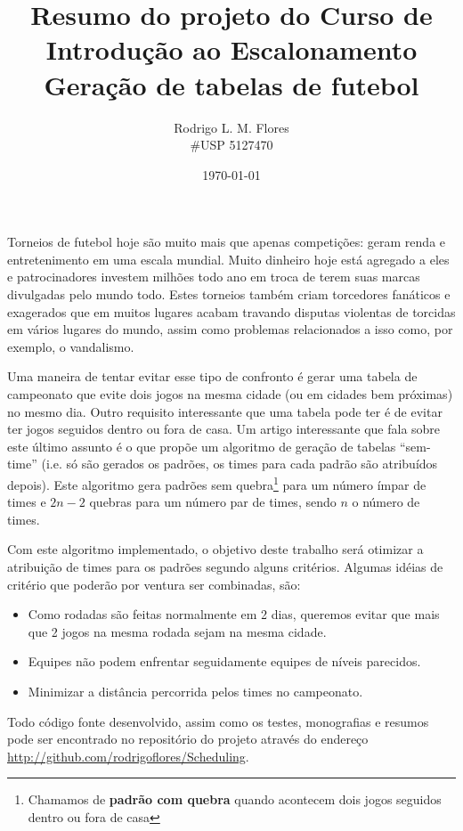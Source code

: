 \documentclass[a4paper,12pt,notitlepage]{article}
\title{Resumo do projeto do Curso de Introdução ao Escalonamento \\ Geração de tabelas de futebol}
\author{Rodrigo L. M. Flores \\ \#USP 5127470}
\date{\today}
\begin{document}
\maketitle

Torneios de futebol hoje são muito mais que apenas competições: geram renda e entretenimento em uma escala mundial. Muito dinheiro
hoje está agregado a eles e patrocinadores investem milhões todo ano em troca de terem suas marcas divulgadas pelo mundo todo. Estes
torneios também criam torcedores fanáticos e exagerados que em muitos lugares acabam travando disputas violentas de torcidas em vários 
lugares do mundo, assim como problemas relacionados a isso como, por exemplo, o vandalismo.

Uma maneira de tentar evitar esse tipo de confronto é gerar uma tabela de campeonato que evite
dois jogos na mesma cidade (ou em cidades bem próximas) no mesmo dia. Outro requisito interessante que uma tabela pode ter é de evitar
ter jogos seguidos dentro ou fora de casa. Um artigo interessante que fala sobre este último assunto é o \cite{90Schreuder}
que propõe um algoritmo de geração de tabelas ``sem-time'' (i.e. só são gerados os padrões, os times para cada padrão 
são atribuídos depois). Este algoritmo gera padrões sem quebra\footnote{Chamamos de \textbf{padrão com quebra} quando acontecem dois jogos seguidos
dentro ou fora de casa} para um número ímpar de times e $2n - 2$ quebras para um número par de times, sendo $n$ o número de times.

Com este algoritmo implementado, o objetivo deste trabalho será otimizar a atribuição de times para os padrões segundo alguns critérios. 
Algumas idéias de critério que poderão por ventura ser combinadas, são:

\begin{itemize}
	\item Como rodadas são feitas normalmente em 2 dias, queremos evitar que mais que 2 jogos na mesma rodada sejam na mesma cidade. 
	\item Equipes não podem enfrentar seguidamente equipes de níveis parecidos. 
	\item Minimizar a distância percorrida pelos times no campeonato.
\end{itemize}

Todo código fonte desenvolvido, assim como os testes, monografias e resumos 
pode ser encontrado no repositório do projeto através do endereço \url{http://github.com/rodrigoflores/Scheduling}.



\end{document}
